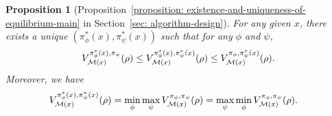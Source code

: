 \documentclass{article}
\theoremstyle{plain}
\newtheorem{proposition}{Proposition}
\theoremstyle{definition}
\theoremstyle{remark}
\def\cM{\mathcal M}
\begin{document}
\begin{proposition}[Proposition~\ref{proposition: existence-and-uniqueness-of-equilibrium-main} in Section~\ref{sec: algorithm-design}]
    \label{proposition: existence-and-uniqueness-of-equlibrium}
    For any given $x$, there exists a unique $(\pi_\phi^*(x), \pi_\psi^*(x))$ such that for any $\phi$ and $\psi$,
    \begin{align}
        V^{\pi_\phi^*(x),\pi_\psi}_{\cM(x)}(\rho) \leq  V^{\pi_\phi^*(x),\pi_\psi^*(x)}_{\cM(x)}(\rho)\leq V^{\pi_\phi,\pi_\psi^*(x)}_{\cM(x)}(\rho).\notag
    \end{align}
    Moreover, we have
    \begin{align}
        V^{\pi_\phi^*(x),\pi_\psi^*(x)}_{\cM(x)}(\rho) & = \min_{\phi} \max_{\psi}  V^{\pi_\phi,\pi_\psi}_{\cM(x)}(\rho)  = \max_{\psi} \min_{\phi} V^{\pi_\phi,\pi_\psi}_{\cM(x)}(\rho) .\notag
    \end{align}
\end{proposition}
\end{document}

